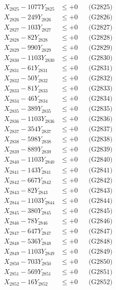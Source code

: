 \documentclass[a4paper,10pt]{article}
\begin{document}
{\begin{align}
X_{2825} - 1077Y_{2825} &\leq +0 && \text{(G2825)} \\
X_{2826} - 249Y_{2826} &\leq +0 && \text{(G2826)} \\
X_{2827} - 103Y_{2827} &\leq +0 && \text{(G2827)} \\
X_{2828} - 82Y_{2828} &\leq +0 && \text{(G2828)} \\
X_{2829} - 990Y_{2829} &\leq +0 && \text{(G2829)} \\
X_{2830} - 1103Y_{2830} &\leq +0 && \text{(G2830)} \\
\allowbreak
X_{2831} - 61Y_{2831} &\leq +0 && \text{(G2831)} \\
X_{2832} - 50Y_{2832} &\leq +0 && \text{(G2832)} \\
X_{2833} - 81Y_{2833} &\leq +0 && \text{(G2833)} \\
X_{2834} - 46Y_{2834} &\leq +0 && \text{(G2834)} \\
X_{2835} - 389Y_{2835} &\leq +0 && \text{(G2835)} \\
X_{2836} - 1103Y_{2836} &\leq +0 && \text{(G2836)} \\
X_{2837} - 354Y_{2837} &\leq +0 && \text{(G2837)} \\
X_{2838} - 598Y_{2838} &\leq +0 && \text{(G2838)} \\
X_{2839} - 889Y_{2839} &\leq +0 && \text{(G2839)} \\
X_{2840} - 1103Y_{2840} &\leq +0 && \text{(G2840)} \\
\allowbreak
X_{2841} - 143Y_{2841} &\leq +0 && \text{(G2841)} \\
X_{2842} - 667Y_{2842} &\leq +0 && \text{(G2842)} \\
X_{2843} - 82Y_{2843} &\leq +0 && \text{(G2843)} \\
X_{2844} - 1103Y_{2844} &\leq +0 && \text{(G2844)} \\
X_{2845} - 380Y_{2845} &\leq +0 && \text{(G2845)} \\
X_{2846} - 78Y_{2846} &\leq +0 && \text{(G2846)} \\
X_{2847} - 647Y_{2847} &\leq +0 && \text{(G2847)} \\
X_{2848} - 536Y_{2848} &\leq +0 && \text{(G2848)} \\
X_{2849} - 1103Y_{2849} &\leq +0 && \text{(G2849)} \\
X_{2850} - 703Y_{2850} &\leq +0 && \text{(G2850)} \\
\allowbreak
X_{2851} - 569Y_{2851} &\leq +0 && \text{(G2851)} \\
X_{2852} - 16Y_{2852} &\leq +0 && \text{(G2852)} \\

\end{align}}
\end{document}
